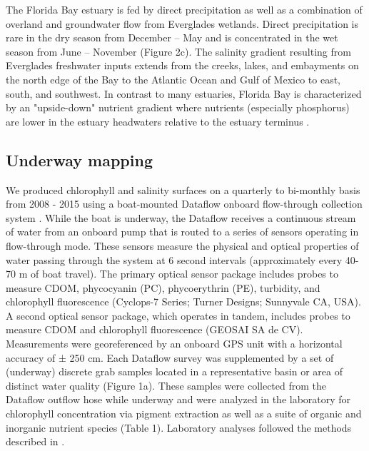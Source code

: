 The Florida Bay estuary is fed by direct precipitation as well as  a combination of overland and groundwater flow from Everglades wetlands. Direct precipitation is rare in the dry season from December – May and is concentrated in the wet season from June – November (Figure 2c). The salinity gradient resulting from Everglades freshwater inputs extends from the creeks, lakes, and embayments on the north edge of the Bay to the Atlantic Ocean and Gulf of Mexico to east, south, and southwest. In contrast to many estuaries, Florida Bay is characterized by an "upside-down" nutrient gradient where nutrients (especially phosphorus) are lower in the estuary headwaters relative to the estuary terminus \citep{childers_relating_2006}.

\subsection{Underway mapping}
\label{chlmapping}

We produced chlorophyll and salinity surfaces on a quarterly to bi-monthly basis from 2008 - 2015 using a boat-mounted Dataflow onboard flow-through collection system \citep{madden1992instrument}. While the boat is underway, the Dataflow receives a continuous stream of water from an onboard pump that is routed to a series of sensors operating in flow-through mode. These sensors measure the physical and optical properties of water passing through the system at 6 second intervals (approximately every 40-70 m of boat travel). The primary optical sensor package includes probes to measure CDOM, phycocyanin (PC), phycoerythrin (PE), turbidity, and chlorophyll fluorescence (Cyclops-7 Series; Turner Designs; Sunnyvale CA, USA). A second optical sensor package, which operates in tandem, includes probes to measure CDOM and chlorophyll fluorescence (GEOSAI SA de CV). Measurements were georeferenced by an onboard GPS unit with a horizontal accuracy of ± 250 cm. Each Dataflow survey was supplemented by a set of (underway) discrete grab samples located in a representative basin or area of distinct water quality (Figure 1a). These samples were collected from the Dataflow outflow hose while underway and were analyzed in the laboratory for chlorophyll concentration via pigment extraction as well as a suite of organic and inorganic nutrient species (Table 1). Laboratory analyses followed the methods described in \citep{childers_relating_2006}. 

